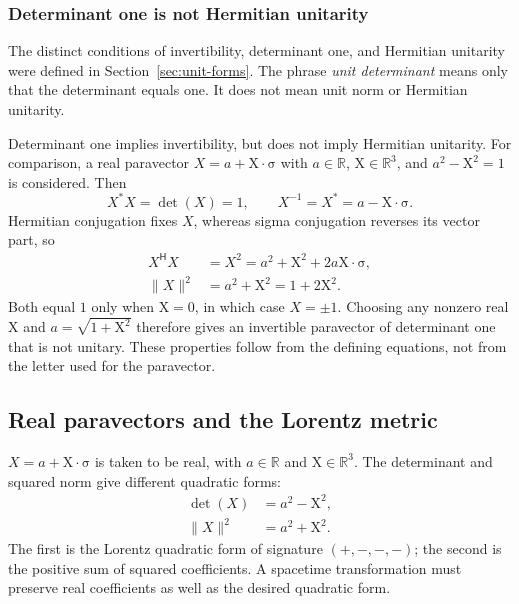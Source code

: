 \documentclass[11pt]{article}
\newcommand{\pv}[1]{{#1}}
\newcommand{\vstyle}[1]{{\bm{\mathrm{#1}}}}
\newcommand{\pX}{\pv{X}}
\numberwithin{equation}{section}
\newcommand{\R}{\mathbb{R}}
\newcommand{\dotprod}{\cdot}
\newcommand{\bsig}{\vstyle{\sigma}}
\newcommand{\bX}{\vstyle{X}}
\begin{document}
\subsubsection{Determinant one is not Hermitian unitarity}
\label{sec:determinant-versus-unitarity}

The distinct conditions of invertibility, determinant one, and
Hermitian unitarity were defined in Section~\ref{sec:unit-forms}.
The phrase \emph{unit determinant} means
only that the determinant equals one. It does not mean unit norm or
Hermitian unitarity.

Determinant one implies invertibility, but does not imply Hermitian unitarity.
For comparison, a real paravector $\pX=a+\bX\dotprod\bsig$
with $a\in\R$, $\bX\in\R^3$, and $a^2-\bX^2=1$ is considered.  Then
\[
 \pX^*\pX=\det(\pX)=1,\qquad
 \pX^{-1}=\pX^*=a-\bX\dotprod\bsig.
\]
Hermitian conjugation fixes
$\pX$, whereas sigma conjugation reverses its vector part, so
\begin{align*}
 \pX^{\mathsf H}\pX&=\pX^2=a^2+\bX^2+2a\bX\dotprod\bsig,\\
 \lVert\pX\rVert^2&=a^2+\bX^2=1+2\bX^2.
\end{align*}
Both equal $1$ only when $\bX=0$, in which case $\pX=\pm1$.
Choosing any nonzero real $\bX$ and $a=\sqrt{1+\bX^2}$ therefore gives
an invertible paravector of determinant one that is not unitary.
These properties follow from the defining equations, not from the
letter used for the paravector.

\subsection{Real paravectors and the Lorentz metric}
\label{sec:real-lorentz-invariants}

$\pX=a+\bX\dotprod\bsig$ is taken to be real, with $a\in\R$ and
$\bX\in\R^3$.  The determinant and squared norm give different quadratic forms:
\begin{align*}
 \det(\pX)&=a^2-\bX^2,\\
 \lVert \pX\rVert^2&=a^2+\bX^2.
\end{align*}
The first is the Lorentz quadratic form of signature $(+,-,-,-)$;
the second is the positive sum of squared coefficients. A spacetime
transformation must preserve real coefficients as well as the desired
quadratic form.
\end{document}
